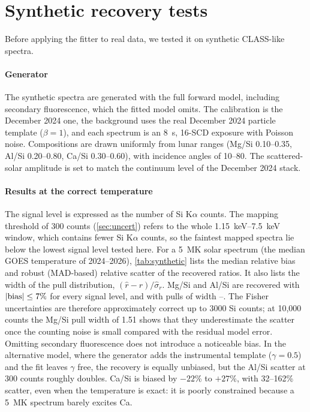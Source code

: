 \section{Synthetic recovery tests}\label{sec:synthetic}

Before applying the fitter to real data, we tested it on synthetic CLASS-like spectra.

\paragraph{Generator} The synthetic spectra are generated with the full forward model, including secondary fluorescence, which the fitted model omits. The calibration is the December 2024 one, the background uses the real December 2024 particle template ($\beta=1$), and each spectrum is an \SI{8}{s}, 16-SCD exposure with Poisson noise. Compositions are drawn uniformly from lunar ranges (Mg/Si 0.10--0.35, Al/Si 0.20--0.80, Ca/Si 0.30--0.60), with incidence angles of 10--80\textdegree. The scattered-solar amplitude is set to match the continuum level of the December 2024 stack.

\paragraph{Results at the correct temperature} The signal level is expressed as the number of Si K$\alpha$ counts. The mapping threshold of 300 counts (\cref{sec:uncert}) refers to the whole \SIrange{1.15}{7.5}{keV} window, which contains fewer Si K$\alpha$ counts, so the faintest mapped spectra lie below the lowest signal level tested here. For a \SI{5}{MK} solar spectrum (the median GOES temperature of 2024--2026), \cref{tab:synthetic} lists the median relative bias and robust (MAD-based) relative scatter of the recovered ratios. It also lists the width of the pull distribution, $(\hat r-r)/\hat\sigma_r$. Mg/Si and Al/Si are recovered with $|\text{bias}|\le7\%$ for every signal level, and with pulls of width \SynPullLo--\SynPullHi. The Fisher uncertainties are therefore approximately correct up to 3000 Si counts; at 10{,}000 counts the Mg/Si pull width of 1.51 shows that they underestimate the scatter once the counting noise is small compared with the residual model error. Omitting secondary fluorescence does not introduce a noticeable bias. In the alternative model, where the generator adds the instrumental template ($\gamma=0.5$) and the fit leaves $\gamma$ free, the recovery is equally unbiased, but the Al/Si scatter at 300 counts roughly doubles. Ca/Si is biased by $-22$\% to $+27$\%, with 32--162\% scatter, even when the temperature is exact: it is poorly constrained because a \SI{5}{MK} spectrum barely excites Ca.

